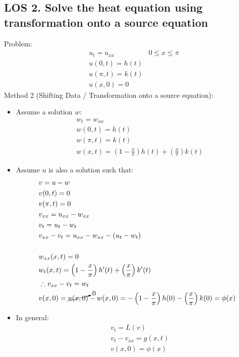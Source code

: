 \documentclass[12pt, a4paper]{article}
\begin{document}
\subsection*{LOS 2. Solve the heat equation using transformation onto a source equation}
Problem:
\begin{align*}
    &u_t = u_{xx} & 0\leq x\leq\pi\\
    &u(0,t) = h(t)\\
    &u(\pi, t) = k(t)\\
    &u(x, 0) = 0
\end{align*}
Method 2 (Shifting Data / Transformation onto a source equation):
\begin{itemize}
    \item Assume a solution $w$:
    \begin{align*}
        &w_t = w_{xx}\\
        &w(0, t) = h(t)\\
        &w(\pi, t) = k(t)\\
        &w(x, t) = \left(1-\frac{x}{\pi}\right)h(t) + \left(\frac{x}{\pi}\right)k(t)
    \end{align*}
    \item Assume $u$ is also a solution such that:
    \begin{align*}
        &v = u-w\\
        &v(0,t) = 0\\
        &v(\pi,t) = 0\\
        &v_{xx} = u_{xx} - w_{xx}\\
        &v_t = u_t - w_t\\
        &v_{xx} - v_t = u_{xx} - w_{xx}- (u_t - w_t)\\\\
        &w_{xx}(x, t) = 0\\
        &w_t(x, t) = \left(1-\frac{x}{\pi}\right)h'(t) + \left(\frac{x}{\pi}\right)k'(t)\\
        &\therefore v_{xx} - v_{t} = w_t\\
        &v(x, 0) = \cancelto{0}{u(x, 0)}- w(x, 0) = -\left(1-\frac{x}{\pi}\right)h(0) - \left(\frac{x}{\pi}\right)k(0)= \phi(x)
    \end{align*}
    \item In general:
    \begin{align*}
        &v_t = L(v)\\
        &v_t - v_{xx} = g(x, t)\\
        &v(x, 0) = \phi(x)\\\\

\end{align*}
\end{itemize}
\end{document}
